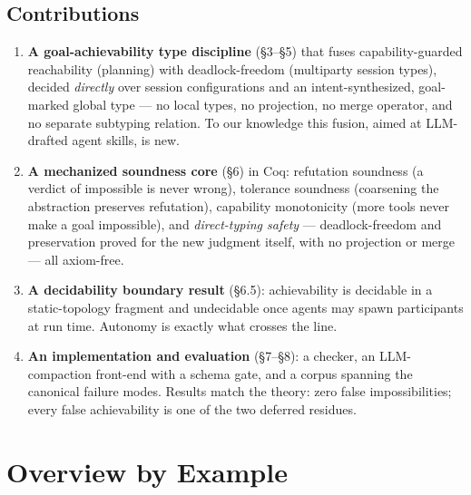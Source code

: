 \documentclass[11pt]{article}
\theoremstyle{plain}
\theoremstyle{definition}
\begin{document}
\subsection{Contributions}
\begin{enumerate}\setlength{\itemsep}{2pt}
\item \textbf{A goal-achievability type discipline} (\S3--\S5) that fuses
capability-guarded reachability (planning) with deadlock-freedom (multiparty
session types), decided \emph{directly} over session configurations and an
intent-synthesized, goal-marked global type --- no local types, no projection, no
merge operator, and no separate subtyping relation. To our knowledge this fusion,
aimed at LLM-drafted agent skills, is new.
\item \textbf{A mechanized soundness core} (\S6) in Coq: refutation soundness
(a verdict of impossible is never wrong), tolerance soundness (coarsening the
abstraction preserves refutation), capability monotonicity (more tools never
make a goal impossible), and \emph{direct-typing safety} --- deadlock-freedom and
preservation proved for the new judgment itself, with no projection or merge
--- all axiom-free.
\item \textbf{A decidability boundary result} (\S6.5): achievability is decidable
in a static-topology fragment and undecidable once agents may spawn participants
at run time. Autonomy is exactly what crosses the line.
\item \textbf{An implementation and evaluation} (\S7--\S8): a checker, an
LLM-compaction front-end with a schema gate, and a corpus spanning the canonical
failure modes. Results match the theory: zero false impossibilities; every false
achievability is one of the two deferred residues.
\end{enumerate}

\section{Overview by Example}
\end{document}
